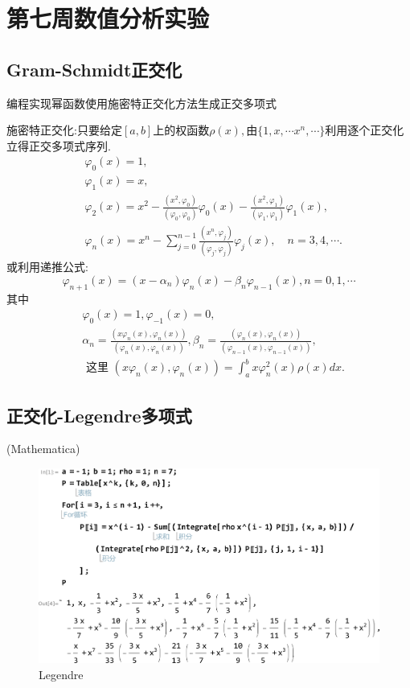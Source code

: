 \section{第七周数值分析实验}
\subsection{Gram-Schmidt正交化}
\begin{ex}
	编程实现幂函数使用施密特正交化方法生成正交多项式
	
	施密特正交化:只要给定$[a,b]$上的权函数$\rho \left( x \right),$由$\{1,x,\cdots x^n,\cdots \}$利用逐个正交化立得正交多项式序列.
	$$
	\begin{aligned}
		& \varphi_0(x)=1, \\
		& \varphi_1(x)=x, \\
		& \varphi_2(x)=x^2-\frac{\left(x^2, \varphi_0\right)}{\left(\varphi_0, \varphi_0\right)} \varphi_0(x)-\frac{\left(x^2, \varphi_1\right)}{\left(\varphi_1, \varphi_1\right)} \varphi_1(x), \\
		& \varphi_n(x)=x^n-\sum_{j=0}^{n-1} \frac{\left(x^n, \varphi_j\right)}{\left(\varphi_j, \varphi_j\right)} \varphi_j(x), \quad n=3,4, \cdots .
	\end{aligned}
	$$
	或利用递推公式:
	$$
	\varphi_{n+1}(x)=\left(x-\alpha_n\right) \varphi_n(x)-\beta_n \varphi_{n-1}(x), n=0,1, \cdots
	$$
	其中
	$$
	\begin{aligned}
		& \varphi_0(x)=1, \varphi_{-1}(x)=0, \\
		& \alpha_n=\frac{\left(x \varphi_n(x), \varphi_n(x)\right)}{\left(\varphi_n(x), \varphi_n(x)\right)}, \beta_n=\frac{\left(\varphi_n(x), \varphi_n(x)\right)}{\left(\varphi_{n-1}(x), \varphi_{n-1}(x)\right)}, \\
		& \text { 这里 }\left(x \varphi_n(x), \varphi_n(x)\right)=\int_a^b x \varphi_n^2(x) \rho(x) d x .
	\end{aligned}
	$$
\end{ex}

\subsection{正交化-Legendre多项式}

\qa (Mathematica)
\begin{figure}[H]
	\centering
	\includegraphics[width = 0.8\linewidth]{day6/fig1.png}
	\caption{Legendre}
\end{figure}
